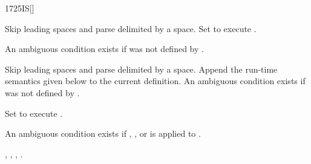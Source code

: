 \begin{worddef}{1725}{IS}[]%
\interpret

	Skip leading spaces and parse  delimited by a space.
	Set  to execute .

	An ambiguous condition exists if  was not defined
	by .

\compile

	Skip leading spaces and parse  delimited by a space.
	Append the run-time semantics given below to the current definition.
	An ambiguous condition exists if  was not defined by
	.

\runtime

	Set  to execute .

	An ambiguous condition exists if , \word{[COMPILE]},
	\word{[']} or  is applied to .

\see {},
	,
	,
	.

	\begin{implement} %
		\word{:}  \\
		\tab {}   \\
		\tab[2]  \word{[']}   \\
		\tab {} \\
		\tab[2]   \\
		\tab {} \word{;} 
	\end{implement}

	\begin{testing} %
		 \\

		 \\

		 \\
	\end{testing}
\end{worddef}


